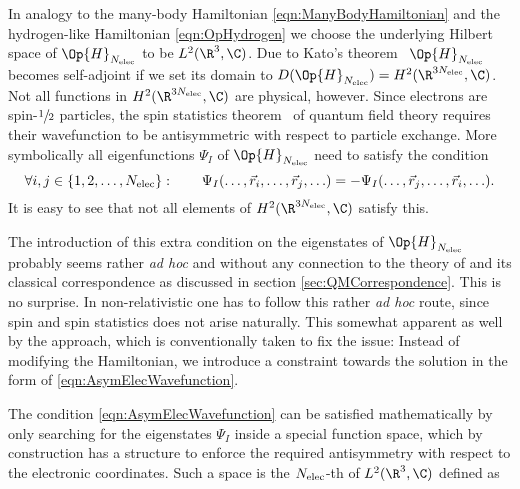 In analogy to the many-body Hamiltonian \eqref{eqn:ManyBodyHamiltonian}
and the hydrogen-like Hamiltonian \eqref{eqn:OpHydrogen}
we choose the underlying Hilbert space of $\Op{H}_{\Nelec}$
to be $L^2(\R^3, \C)$.
Due to Kato's theorem~\cite{Kato1951} $\Op{H}_{\Nelec}$
becomes self-adjoint if we set its domain to $D(\Op{H}_{\Nelec}) = H^2(\R^{3\Nelec}, \C)$.
Not all functions in $H^2(\R^{3\Nelec}, \C)$ are physical, however.
Since electrons are spin-$\sfrac12$ particles,
the spin statistics theorem~\cite{Shankar1994} of quantum field theory
requires their wavefunction to be antisymmetric
with respect to particle exchange.
More symbolically all eigenfunctions $\Psi_I$ of $\Op{H}_{\Nelec}$
need to satisfy the condition
\begin{equation}
	\forall i,j \in \{1, 2, \ldots, N_\text{elec}\}: \qquad
	  \Psi_I(\ldots, \vec{r}_i, \ldots, \vec{r}_j, \ldots) =
	- \Psi_I(\ldots, \vec{r}_j, \ldots, \vec{r}_i, \ldots).
	\label{eqn:AsymElecWavefunction}
\end{equation}
It is easy to see that not all elements of $H^2(\R^{3\Nelec}, \C)$ satisfy this.

The introduction of this extra condition on the eigenstates of $\Op{H}_{\Nelec}$
probably seems rather \textit{ad hoc} and without any connection to the
theory of \QM and its classical correspondence as discussed in section
\vref{sec:QMCorrespondence}.
This is no surprise.
In non-relativistic \QM one has to follow this rather \textit{ad hoc} route,
since spin and spin statistics does not arise naturally.
This somewhat apparent as well by the approach,
which is conventionally taken to fix the issue:
Instead of modifying the Hamiltonian,
we introduce a constraint towards the solution in the form of
\eqref{eqn:AsymElecWavefunction}.

The condition \eqref{eqn:AsymElecWavefunction} can be satisfied mathematically
by only searching for the eigenstates $\Psi_I$ inside a special function space,
which by construction has a structure to enforce the required
antisymmetry with respect to the electronic coordinates.
Such a space is the $N_\text{elec}$-th  of $L^2(\R^3, \C)$ defined as
\newcommand{\wedgestring}{\psi_1 \wedge \psi_2 \wedge \cdots \wedge \psi_{\Nelec}}

